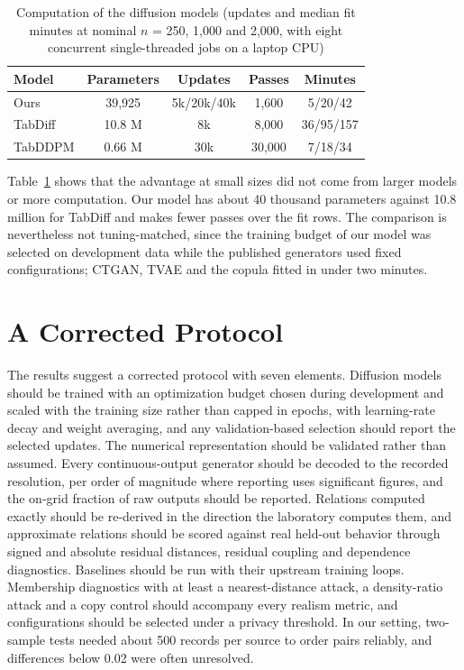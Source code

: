 \documentclass[conference]{IEEEtran}
\begin{document}
\begin{table}[t]
\caption{Computation of the diffusion models (updates and median fit minutes at nominal $n$ = 250, 1,000 and 2,000, with eight concurrent single-threaded jobs on a laptop CPU)}
\label{tab:compute}
\centering
\setlength{\tabcolsep}{2.5pt}
\begin{tabular}{lcccc}
\toprule
Model & Parameters & Updates & Passes & Minutes \\
\midrule
Ours & 39,925 & 5k/20k/40k & 1,600 & 5/20/42 \\
TabDiff & 10.8 M & 8k & 8,000 & 36/95/157 \\
TabDDPM & 0.66 M & 30k & 30,000 & 7/18/34 \\
\bottomrule
\end{tabular}
\end{table}

Table~\ref{tab:compute} shows that the advantage at small sizes did not come from larger models or more computation. Our model has about 40 thousand parameters against 10.8 million for TabDiff and makes fewer passes over the fit rows. The comparison is nevertheless not tuning-matched, since the training budget of our model was selected on development data while the published generators used fixed configurations; CTGAN, TVAE and the copula fitted in under two minutes.

\section{A Corrected Protocol}

The results suggest a corrected protocol with seven elements. Diffusion models should be trained with an optimization budget chosen during development and scaled with the training size rather than capped in epochs, with learning-rate decay and weight averaging, and any validation-based selection should report the selected updates. The numerical representation should be validated rather than assumed. Every continuous-output generator should be decoded to the recorded resolution, per order of magnitude where reporting uses significant figures, and the on-grid fraction of raw outputs should be reported. Relations computed exactly should be re-derived in the direction the laboratory computes them, and approximate relations should be scored against real held-out behavior through signed and absolute residual distances, residual coupling and dependence diagnostics. Baselines should be run with their upstream training loops. Membership diagnostics with at least a nearest-distance attack, a density-ratio attack and a copy control should accompany every realism metric, and configurations should be selected under a privacy threshold. In our setting, two-sample tests needed about 500 records per source to order pairs reliably, and differences below 0.02 were often unresolved.
\end{document}

